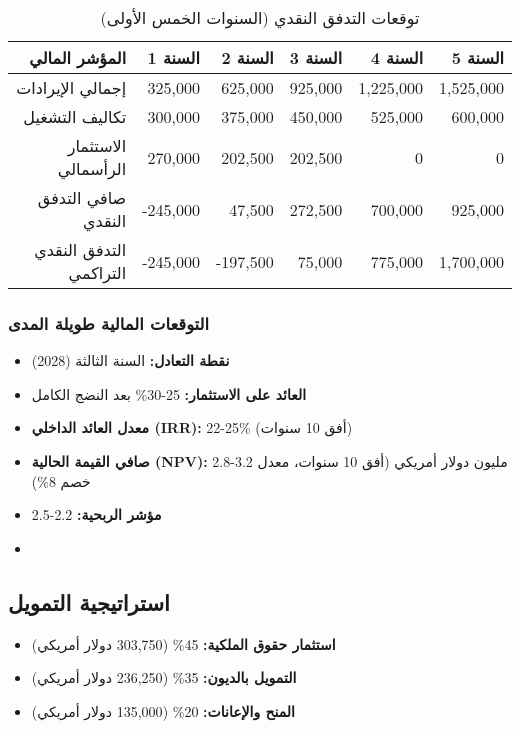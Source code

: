 \begin{table}[h]
\centering
\begin{tabular}{|r|r|r|r|r|r|}
\hline
\textbf{المؤشر المالي} & \textbf{السنة 1} & \textbf{السنة 2} & \textbf{السنة 3} & \textbf{السنة 4} & \textbf{السنة 5} \\
\hline
إجمالي الإيرادات & 325,000 & 625,000 & 925,000 & 1,225,000 & 1,525,000 \\
تكاليف التشغيل & 300,000 & 375,000 & 450,000 & 525,000 & 600,000 \\
الاستثمار الرأسمالي & 270,000 & 202,500 & 202,500 & 0 & 0 \\
\hline
صافي التدفق النقدي & -245,000 & 47,500 & 272,500 & 700,000 & 925,000 \\
التدفق النقدي التراكمي & -245,000 & -197,500 & 75,000 & 775,000 & 1,700,000 \\
\hline
\end{tabular}
\caption{توقعات التدفق النقدي (السنوات الخمس الأولى)}
\end{table}

\subsubsection{التوقعات المالية طويلة المدى}
\begin{itemize}
    \item \textbf{نقطة التعادل:} السنة الثالثة (2028)
    \item \textbf{العائد على الاستثمار:} 25-30\% بعد النضج الكامل
    \item \textbf{معدل العائد الداخلي (IRR):} 22-25\% (أفق 10 سنوات)
    \item \textbf{صافي القيمة الحالية (NPV):} 2.8-3.2 مليون دولار أمريكي (أفق 10 سنوات، معدل خصم 8\%)
    \item \textbf{مؤشر الربحية:} 2.2-2.5
    \item \textbf{} 
\end{itemize}

\subsection{استراتيجية التمويل}
\begin{itemize}
    \item \textbf{استثمار حقوق الملكية:} 45\% (303,750 دولار أمريكي)
    \item \textbf{التمويل بالديون:} 35\% (236,250 دولار أمريكي)
    \item \textbf{المنح والإعانات:} 20\% (135,000 دولار أمريكي)
\end{itemize}

